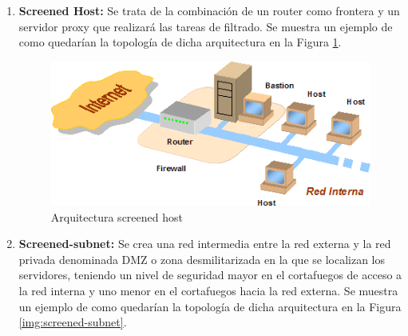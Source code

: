 \begin{enumerate}
\begin{enumerate}
\item {\bfseries Screened Host:}
Se trata de la combinación de un router como frontera y un servidor proxy que realizará las tareas de filtrado. Se muestra un ejemplo de como quedarían la topología de dicha arquitectura en la Figura \ref{img:screened-host}.

\begin{figure}[H]
  		   \centering
     		   \includegraphics[width=5in]{screened-host.png}
  		   \caption{Arquitectura screened host \cite{firewall}}
  		   \label{img:screened-host}
\end{figure}

\item {\bfseries Screened-subnet:}
Se crea una red intermedia entre la red externa y la red privada denominada DMZ o zona desmilitarizada en la que se localizan los servidores, teniendo un nivel de seguridad mayor en el cortafuegos de acceso a la red interna y uno menor en el cortafuegos hacia la red externa. Se muestra un ejemplo de como quedarían la topología de dicha arquitectura en la Figura \ref{img:screened-subnet}.


\end{enumerate}
\end{enumerate}
